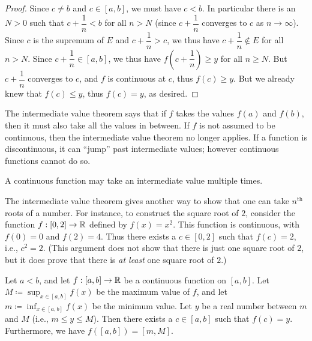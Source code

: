 \begin{proof}
  Since \(c \neq b\) and \(c \in [a, b]\), we must have \(c < b\).
  In particular there is an \(N > 0\) such that \(c + \dfrac{1}{n} < b\) for all \(n > N\)
  (since \(c + \dfrac{1}{n}\) converges to \(c\) as \(n \to \infty\)).
  Since \(c\) is the supremum of \(E\) and \(c + \dfrac{1}{n} > c\), we thus have \(c + \dfrac{1}{n} \notin E\) for all \(n > N\).
  Since \(c + \dfrac{1}{n} \in [a, b]\), we thus have \(f(c + \dfrac{1}{n}) \geq y\) for all \(n \geq N\).
  But \(c + \dfrac{1}{n}\) converges to \(c\), and \(f\) is continuous at \(c\), thus \(f(c) \geq y\).
  But we already knew that \(f(c) \leq y\), thus \(f(c) = y\), as desired.
\end{proof}

\begin{note}
  The intermediate value theorem says that if \(f\) takes the values \(f(a)\) and \(f(b)\), then it must also take all the values in between.
  If \(f\) is not assumed to be continuous, then the intermediate value theorem no longer applies.
  If a function is discontinuous, it can ``jump'' past intermediate values;
  however continuous functions cannot do so.
\end{note}

\begin{rmk}\label{i:9.7.2}
  A continuous function may take an intermediate value multiple times.
\end{rmk}

\begin{rmk}\label{i:9.7.3}
  The intermediate value theorem gives another way to show that one can take \(n^{\text{th}}\) roots of a number.
  For instance, to construct the square root of \(2\), consider the function \(f : [0, 2] \to \mathbb{R}\) defined by \(f(x) = x^2\).
  This function is continuous, with \(f(0) = 0\) and \(f(2) = 4\).
  Thus there exists a \(c \in [0, 2]\) such that \(f(c) = 2\), i.e., \(c^2 = 2\).
  (This argument does not show that there is just one square root of \(2\), but it does prove that there is \emph{at least} one square root of \(2\).)
\end{rmk}

\begin{cor}\label{i:9.7.4}
  Let \(a < b\), and let \(f : [a, b] \to \mathbb{R}\) be a continuous function on \([a, b]\).
  Let \(M \coloneqq \sup_{x \in [a, b]} f(x)\) be the maximum value of \(f\), and let \(m \coloneqq \inf_{x \in [a, b]} f(x)\) be the minimum value.
  Let \(y\) be a real number between \(m\) and \(M\) (i.e., \(m \leq y \leq M\)).
  Then there exists a \(c \in [a, b]\) such that \(f(c) = y\).
  Furthermore, we have \(f([a, b]) = [m, M]\).
\end{cor}

